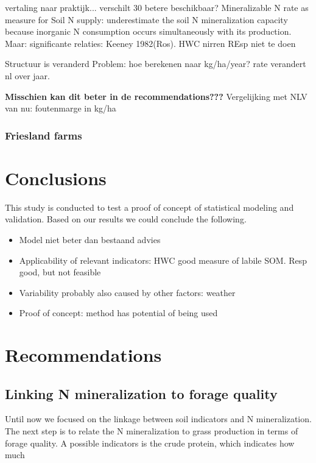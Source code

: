\documentclass[10pt,twoside,dutch,english]{report}
\begin{document}
vertaling naar praktijk... verschilt 30%
betere beschikbaar?
    Mineralizable N rate as measure for Soil N supply: underestimate the soil N mineralization capacity because inorganic N consumption occurs simultaneously with its production. Maar: significante relaties: Keeney 1982(Ros). 
    HWC nirren
    REsp niet te doen
    
    Structuur is veranderd
    Problem: hoe berekenen naar kg/ha/year? rate verandert nl over jaar. 

\textbf{Misschien kan dit beter in de recommendations???}
Vergelijking met NLV van nu: foutenmarge in kg/ha 


\subsection{Friesland farms}

   
  

\chapter{Conclusions }

This study is conducted to test a proof of concept of statistical modeling and validation. Based on our results we could conclude the following. 
\begin{itemize}
\item Model niet beter dan bestaand advies
\item Applicability of relevant indicators: HWC good measure of labile SOM. Resp good, but not feasible
\item Variability probably also caused by other factors: weather
\item Proof of concept: method has potential of being used
\end{itemize}

\chapter{Recommendations}

	\section{Linking N mineralization to forage quality}
Until now we focused on the linkage between soil indicators and N mineralization. The next step is to relate the N mineralization to grass production in terms of forage quality. A possible indicators is the crude protein, which indicates how much 
\end{document}

